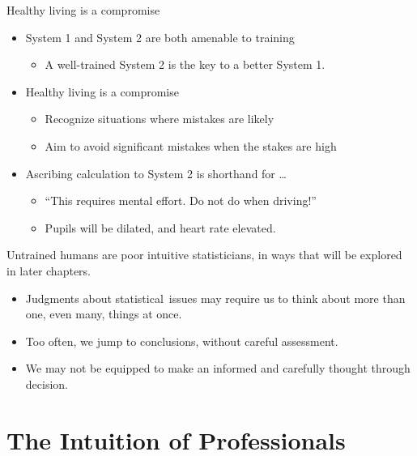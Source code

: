 \documentclass[
  10pt,
  b5paper]{book}
\providecommand{\tightlist}{%
  \setlength{\itemsep}{0pt}\setlength{\parskip}{0pt}}
\begin{document}
Healthy living is a compromise

\begin{itemize}
\tightlist
\item
  System 1 and System 2 are both amenable to training

  \begin{itemize}
  \tightlist
  \item
    A well-trained System 2 is the key to a better System 1.\\
  \end{itemize}
\item
  Healthy living is a compromise

  \begin{itemize}
  \tightlist
  \item
    Recognize situations where mistakes are likely
  \item
    Aim to avoid significant mistakes when the stakes are high
  \end{itemize}
\item
  Ascribing calculation to System 2 is shorthand for \ldots{}

  \begin{itemize}
  \tightlist
  \item
    ``This requires mental effort. Do not do when driving!''
  \item
    Pupils will be dilated, and heart rate elevated.
  \end{itemize}
\end{itemize}

Untrained humans are poor intuitive statisticians, in ways that
will be explored in later chapters.

\begin{itemize}
\tightlist
\item
  Judgments about statistical~issues may require us to think
  about more than one, even many, things at once.
\item
  Too often, we jump to conclusions, without careful assessment.
\item
  We may not be equipped to make an informed and carefully
  thought through decision.
\end{itemize}

\hypertarget{the-intuition-of-professionals}{%
\section{The Intuition of Professionals}\label{the-intuition-of-professionals}}
\end{document}
